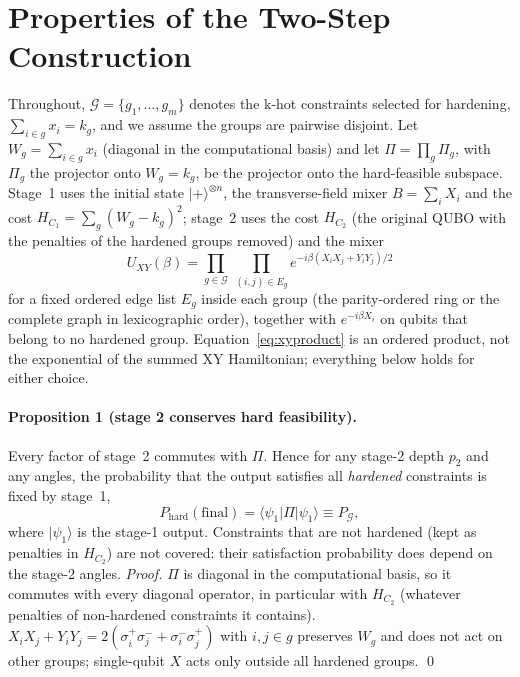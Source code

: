 \section{Properties of the Two-Step Construction}
\label{sec:theory}

Throughout, $\mathcal{G}=\{g_1,\dots,g_m\}$ denotes the k-hot constraints selected for hardening,
$\sum_{i\in g}x_i=k_g$, and we assume the groups are pairwise disjoint.
Let $W_g=\sum_{i\in g}x_i$ (diagonal in the computational basis) and let
$\Pi=\prod_{g}\Pi_g$, with $\Pi_g$ the projector onto $W_g=k_g$, be the projector onto the
hard-feasible subspace. Stage~1 uses the initial state $|+\rangle^{\otimes n}$, the transverse-field
mixer $B=\sum_i X_i$ and the cost $H_{C_1}=\sum_{g}(W_g-k_g)^2$; stage~2 uses the cost
$H_{C_2}$ (the original QUBO with the penalties of the hardened groups removed) and the mixer
\begin{equation}
U_{XY}(\beta)=\prod_{g\in\mathcal{G}}\ \prod_{(i,j)\in E_g} e^{-i\beta (X_iX_j+Y_iY_j)/2}
\label{eq:xyproduct}
\end{equation}
for a fixed ordered edge list $E_g$ inside each group (the parity-ordered ring or the complete graph in lexicographic order),
together with $e^{-i\beta X_i}$ on qubits that belong to no hardened group.
Equation~\eqref{eq:xyproduct} is an ordered product, not the exponential of the summed XY Hamiltonian;
everything below holds for either choice.

\paragraph{Proposition 1 (stage 2 conserves hard feasibility).}
Every factor of stage~2 commutes with $\Pi$. Hence for any stage-2 depth $p_2$ and any angles,
the probability that the output satisfies all \emph{hardened} constraints is fixed by stage~1,
\begin{equation}
P_{\mathrm{hard}}(\text{final}) = \langle\psi_1|\Pi|\psi_1\rangle \equiv P_{\mathcal{G}} ,
\end{equation}
where $|\psi_1\rangle$ is the stage-1 output. Constraints that are not hardened (kept as penalties in $H_{C_2}$) are not covered: their satisfaction
probability does depend on the stage-2 angles.
\emph{Proof.} $\Pi$ is diagonal in the computational basis, so it commutes with every diagonal operator, in particular with $H_{C_2}$ (whatever penalties of non-hardened constraints it contains). $X_iX_j+Y_iY_j=2(\sigma^+_i\sigma^-_j+\sigma^-_i\sigma^+_j)$ with $i,j\in g$
preserves $W_g$ and does not act on other groups; single-qubit $X$ acts only outside all hardened groups.
\qed

